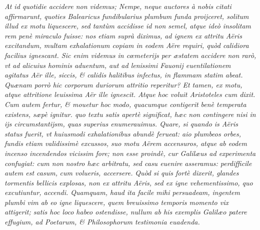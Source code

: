 \documentclass[11pt,twoside,openany]{book}
\begin{document}
\par\bigskip\noindent{}\enspace \textit{At id quotidie accidere non videmus; Nempe, neque auctores à nobis citati affirmarunt, quoties Balearicus fundibularius plumbum funda proijceret, solitum illud ex motu liquescere, sed tantùm accidisse id non semel, atque ideò insolitam rem penè miraculo fuisse: nos etiam suprà diximus, ad ignem ex attritu Aëris excitandum, multam exhalationum copiam in eodem Aëre requiri, quòd calidiora facilius ignescant. Sic enim videmus in cœmeterijs per æstatem accidere non rarò, vt ad alicuius hominis aduentum, aut ad lenissimi Fauonij euentilationem agitatus Aër ille, siccis, \& calidis halitibus infectus, in flammam statim abeat. Quænam porrò hic corporum duriorum attritio reperitur? Et tamen, ex motu, atque attritione leuissima Aër ille ignescit. Atque hoc voluit Aristoteles cum dixit. Cum autem fertur, \& mouetur hoc modo, quacumque contigerit benè temperata existens, sæpè ignitur. quo textu satis apertè significat, hæc non contingere nisi in ijs circumstantijsm, quas superius enumerauimus. Quare, si quando is Aëris status fuerit, vt huiusmodi exhalationibus abundè ferueat: aio plumbeos orbes, fundis etiam validissimè excussos, suo motu Aërem accensuros, atque ab eodem incenso incendendos vicissim fore; non esse proindè, cur Galilæus ad experimenta confugiat: cum non nostro hæc arbitratu, sed casu euenire asseramus: perdifficile autem est casum, }\textit{cum volueris, accersere. }\textit{Quòd si quis fortè dixerit, glandes tormentis bellicis explosas, non ex attritu Aëris, sed ex igne vehementissimo, quo excutiuntur, accendi. Quamquam, haud ita facile mihi persuadeam, ingentem plumbi vim ab eo igne liquescere, quem breuissimo temporis momento vix attigerit; satis hoc loco habeo ostendisse, nullum ab his exemplis Galilæo patere effugium, ad Poetarum, \& Philosophorum testimonia euadenda.}
\end{document}
